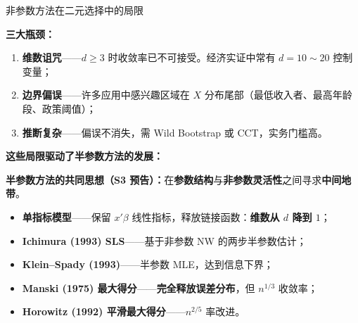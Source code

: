 \documentclass[aspectratio=169, 10pt]{beamer}
\begin{document}
\begin{frame}{非参数方法在二元选择中的局限}

  \begin{highlightbox}
    \textbf{三大瓶颈：}
    \begin{enumerate}
      \item \textbf{维数诅咒}——$d\geq 3$ 时收敛率已不可接受。经济实证中常有 $d=10\sim 20$ 控制变量；
      \item \textbf{边界偏误}——许多应用中感兴趣区域在 $X$ 分布尾部（最低收入者、最高年龄段、政策阈值）；
      \item \textbf{推断复杂}——偏误不消失，需 Wild Bootstrap 或 CCT，实务门槛高。
    \end{enumerate}
  \end{highlightbox}

  \vspace{0.3em}

  \textbf{这些局限驱动了半参数方法的发展：}

  \begin{keybox}
    \textbf{半参数方法的共同思想（S3 预告）：}在\textbf{参数结构}与\textbf{非参数灵活性}之间寻求\textbf{中间地带}。
    \begin{itemize}
      \item \textbf{单指标模型}——保留 $x'\beta$ 线性指标，释放链接函数：\textbf{维数从 $d$ 降到 $1$}；
      \item \textbf{Ichimura (1993) SLS}——基于非参数 NW 的两步半参数估计；
      \item \textbf{Klein--Spady (1993)}——半参数 MLE，达到信息下界；
      \item \textbf{Manski (1975) 最大得分}——\textbf{完全释放误差分布}，但 $n^{1/3}$ 收敛率；
      \item \textbf{Horowitz (1992) 平滑最大得分}——$n^{2/5}$ 率改进。
    \end{itemize}
  \end{keybox}

\end{frame}
\end{document}
